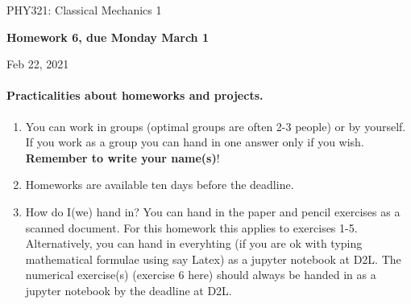 \documentclass[%
oneside,                 %
final,                   %
10pt]{article}
\begin{document}

\newcommand{\exercisesection}[1]{\subsection*{#1}}






\thispagestyle{empty}

\begin{center}
{\LARGE\bf
\begin{spacing}{1.25}
PHY321: Classical Mechanics 1
\end{spacing}
}
\end{center}


\begin{center}
{\bf Homework 6, due Monday  March 1${}^{}$} \\ [0mm]
\end{center}

\begin{center}
\end{center}
    

\begin{center}
Feb 22, 2021
\end{center}

\vspace{1cm}


\paragraph{Practicalities about  homeworks and projects.}
\begin{enumerate}
\item You can work in groups (optimal groups are often 2-3 people) or by yourself. If you work as a group you can hand in one answer only if you wish. \textbf{Remember to write your name(s)}!

\item Homeworks are available ten days before the deadline.

\item How do I(we)  hand in?  You can hand in the paper and pencil exercises as a scanned document. For this homework this applies to exercises 1-5. Alternatively, you can hand in everyhting (if you are ok with typing mathematical formulae using say Latex) as a jupyter notebook at D2L. The numerical exercise(s) (exercise 6 here) should always be handed in as a jupyter notebook by the deadline at D2L. 
\end{enumerate}
\end{document}
